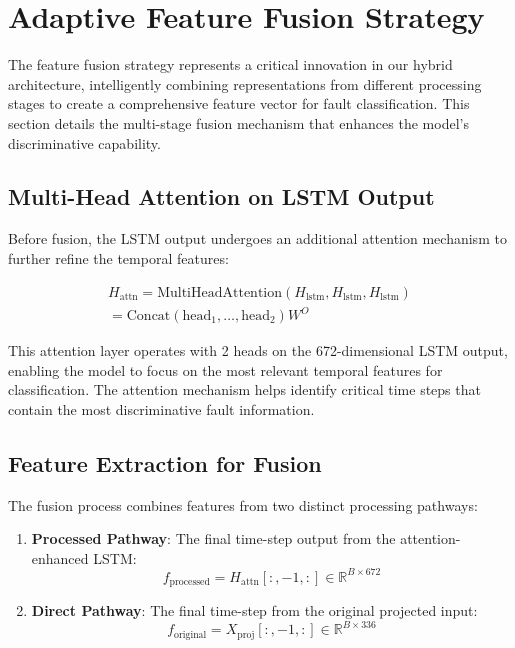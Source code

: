 \section{Adaptive Feature Fusion Strategy}
\label{sec:hybrid_model:fusion_strategy}

The feature fusion strategy represents a critical innovation in our hybrid architecture, intelligently combining representations from different processing stages to create a comprehensive feature vector for fault classification. This section details the multi-stage fusion mechanism that enhances the model's discriminative capability.

\subsection{Multi-Head Attention on LSTM Output}
\label{subsec:lstm_attention}

Before fusion, the LSTM output undergoes an additional attention mechanism to further refine the temporal features:

\begin{align}
H_{\text{attn}} = \text{MultiHeadAttention}(H_{\text{lstm}}, H_{\text{lstm}}, H_{\text{lstm}}) \\
= \text{Concat}(\text{head}_1, \ldots, \text{head}_2)W^O
\end{align}

This attention layer operates with 2 heads on the 672-dimensional LSTM output, enabling the model to focus on the most relevant temporal features for classification. The attention mechanism helps identify critical time steps that contain the most discriminative fault information.

\subsection{Feature Extraction for Fusion}
\label{subsec:feature_extraction_fusion}

The fusion process combines features from two distinct processing pathways:

\begin{enumerate}
    \item \textbf{Processed Pathway}: The final time-step output from the attention-enhanced LSTM:
    \begin{equation}
f_{\text{processed}} = H_{\text{attn}}[:, -1, :] \in \mathbb{R}^{B \times 672}
\end{equation}
    
    \item \textbf{Direct Pathway}: The final time-step from the original projected input:
    \begin{equation}
f_{\text{original}} = X_{\text{proj}}[:, -1, :] \in \mathbb{R}^{B \times 336}
\end{equation}
\end{enumerate}

